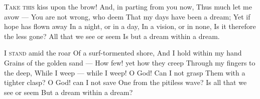 \documentclass[fontsize=9, a5paper]{scrbook}
\newcommand\blankpage{%
    \null
    \thispagestyle{empty}%
    \addtocounter{page}{-1}%
    \newpage}
\begin{document}
\pagebreak

\afterpage{\blankpage}
\begin{poem}
	\begin{stanza}
		\textsc{Take this} kiss upon the brow!\verseline
		And, in parting from you now,\verseline
		Thus much let me avow —\verseline
		You are not wrong, who deem\verseline
		That my days have been a dream;\verseline
		Yet if hope has flown away\verseline
		In a night, or in a day,\verseline
		In a vision, or in none,\verseline
		Is it therefore the less gone? \verseline
		All that we see or seem\verseline
		Is but a dream within a dream.
	\end{stanza}
	
	\begin{stanza}
		\textsc{I stand} amid the roar\verseline
		Of a surf-tormented shore,\verseline
		And I hold within my hand\verseline
		Grains of the golden sand —\verseline
		How few! yet how they creep\verseline
		Through my fingers to the deep,\verseline
		While I weep — while I weep!\verseline
		O God! Can I not grasp\verseline
		Them with a tighter clasp?\verseline
		O God! can I not save\verseline
		One from the pitiless wave?\verseline
		Is all that we see or seem\verseline
		But a dream within a dream?
	\end{stanza}
\end{poem}

\pagebreak
\end{document}
